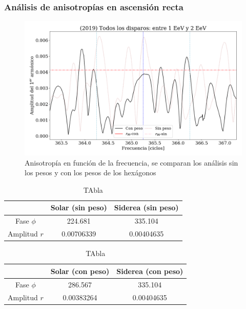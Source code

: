 	\subsubsection{Análisis de anisotropías en ascensión recta}
		
		\begin{figure}[H]
			\centering
			\includegraphics[width=\linewidth]{pesos_sin_con_1_2_EeV.png}
			\caption{Anisotropía en función de la frecuencia, se comparan los análisis sin los pesos y con los pesos de los hexágonos}
		\end{figure}
		
		
		\begin{table}[H]
		\centering
		\begin{tabular}{c|c|c}
					& Solar (sin peso)		& Siderea (sin peso)  \\ \hline
		Fase $\phi$ & 224.681	    		& 335.104			\\
		Amplitud $r$& 0.00706339	    	&0.00404635			\\
		\end{tabular}
		\caption{TAbla}
		
		\end{table}
		
		\begin{table}[H]
		\centering
		\begin{tabular}{c|c|c}
					& Solar (con peso)		& Siderea (con peso)  \\ \hline
		Fase $\phi$ & 286.567	    	& 335.104			\\
		Amplitud $r$& 0.00383264	    &0.00404635			\\
		\end{tabular}
		\caption{TAbla}
		\end{table}
		

